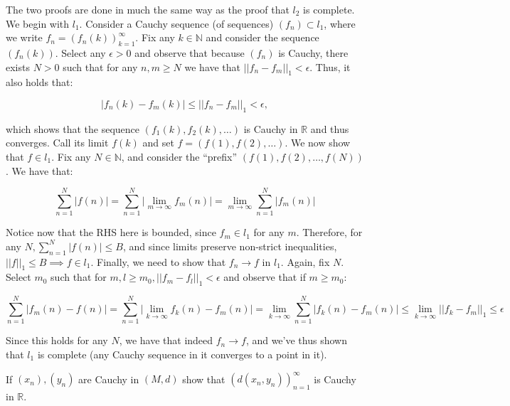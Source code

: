 \begin{solution}
    
    The two proofs are done in much the same way as the proof that $l_2$ is complete.
    We begin with $l_1$.
    Consider a Cauchy sequence (of sequences) $(f_n) \subset l_1$, where we write $f_n = (f_n(k))_{k=1}^{\infty}$.
    Fix any $k \in \mathbb{N}$ and consider the sequence $(f_n(k))$.
    Select any $\epsilon > 0$ and observe that because $(f_n)$ is Cauchy, there exists $N > 0$ such that for any $n, m \geq N$ we have that $\lvert \lvert f_n - f_m \rvert \rvert _{1} < \epsilon$.
    Thus, it also holds that:

    \[\lvert f_n(k) - f_m(k) \rvert \leq \lvert \lvert f_n - f_m \rvert \rvert _{1} < \epsilon,\]

    which shows that the sequence $(f_1(k), f_2(k), \ldots)$ is Cauchy in $\mathbb{R}$ and thus converges.
    Call its limit $f(k)$ and set $f = (f(1), f(2), \ldots)$.
    We now show that $f \in l_1$.
    Fix any $N \in \mathbb{N}$, and consider the ``prefix'' $(f(1), f(2), \ldots, f(N))$.
    We have that:

    \[\sum_{n=1}^{N} \lvert f(n) \rvert = \sum_{n=1}^{N} \lvert \lim_{m \rightarrow \infty} f_m(n) \rvert = \lim_{m \rightarrow \infty} \sum_{n=1}^{N} \lvert f_m(n) \rvert\]

    Notice now that the RHS here is bounded, since $f_m \in l_1$ for any $m$.
    Therefore, for any $N, \sum_{n=1}^{N} \lvert f(n) \rvert \leq B$, and since limits preserve non-strict inequalities, $\lvert \lvert f \rvert \rvert _{1} \leq B \implies f \in l_1$.
    Finally, we need to show that $f_n \rightarrow f$ in $l_1$.
    Again, fix $N$.
    Select $m_0$ such that for $m, l \geq m_0, \lvert \lvert f_m - f_l \rvert \rvert _{1} < \epsilon$ and observe that if $m \geq m_0$:

    \[\sum_{n=1}^{N} \lvert f_m(n) - f(n) \rvert = \sum_{n=1}^{N} \lvert \lim_{k \rightarrow \infty} f_k(n) - f_m(n) \rvert = \lim_{k \rightarrow \infty} \sum_{n=1}^{N} \lvert f_k(n) - f_m(n) \rvert \leq \lim_{k \rightarrow \infty} \lvert \lvert f_k - f_m \rvert \rvert _{1} \leq \epsilon\]

    Since this holds for any $N$, we have that indeed $f_n \rightarrow f$, and we've thus shown that $l_1$ is complete (any Cauchy sequence in it converges to a point in it).


\end{solution}

\begin{exercise}{20}
    If $(x_n), (y_n)$ are Cauchy in $(M, d)$ show that $(d(x_n, y_n))_{n=1}^{\infty}$ is Cauchy in $\mathbb{R}$.
\end{exercise}

